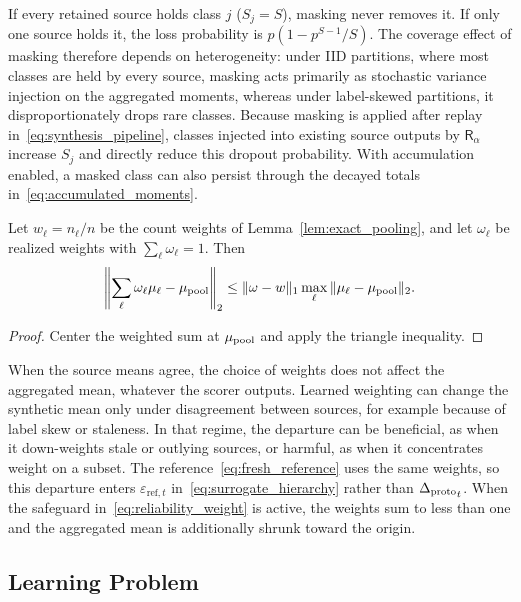 If every retained source holds class $j$ ($S_j=S$), masking never removes it. If only one source holds it, the loss probability is $p(1-p^{S-1}/S)$. The coverage effect of masking therefore depends on heterogeneity: under IID partitions, where most classes are held by every source, masking acts primarily as stochastic variance injection on the aggregated moments, whereas under label-skewed partitions, it disproportionately drops rare classes. Because masking is applied after replay in~\eqref{eq:synthesis_pipeline}, classes injected into existing source outputs by $\mathsf R_\alpha$ increase $S_j$ and directly reduce this dropout probability. With accumulation enabled, a masked class can also persist through the decayed totals in~\eqref{eq:accumulated_moments}.

\begin{prop}
\label{prop:weighting_shift}
Let $w_\ell=n_\ell/n$ be the count weights of Lemma~\ref{lem:exact_pooling}, and let $\omega_\ell$ be realized weights with $\sum_\ell\omega_\ell=1$. Then
\begin{equation}
 \left\|\sum_\ell\omega_\ell\mu_\ell-\mu_{\mathrm{pool}}\right\|_2
 \le\|\omega-w\|_1\max_\ell\|\mu_\ell-\mu_{\mathrm{pool}}\|_2.
 \label{eq:weighting_mean_shift}
\end{equation}
\end{prop}
\begin{proof}
Center the weighted sum at $\mu_{\mathrm{pool}}$ and apply the triangle inequality.
\end{proof}

When the source means agree, the choice of weights does not affect the aggregated mean, whatever the scorer outputs. Learned weighting can change the synthetic mean only under disagreement between sources, for example because of label skew or staleness. In that regime, the departure can be beneficial, as when it down-weights stale or outlying sources, or harmful, as when it concentrates weight on a subset. The reference~\eqref{eq:fresh_reference} uses the same weights, so this departure enters $\varepsilon_{\mathrm{ref},t}$ in~\eqref{eq:surrogate_hierarchy} rather than ${\Delta_{\mathrm{proto}}}_t$. When the safeguard in~\eqref{eq:reliability_weight} is active, the weights sum to less than one and the aggregated mean is additionally shrunk toward the origin.

\subsection{Learning Problem}

